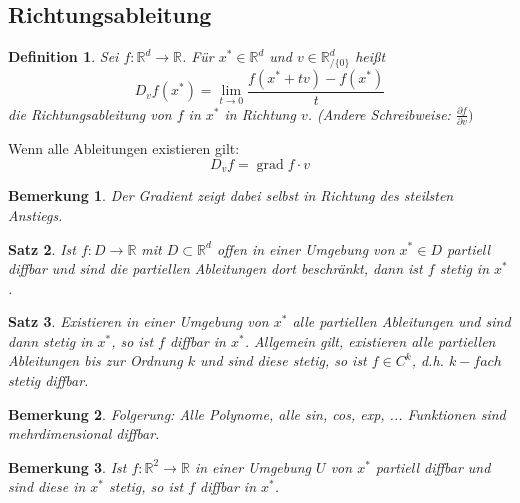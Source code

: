 \documentclass[12pt,a4paper]{report}%
\DeclareMathOperator{\grad}{grad}
\newtheorem{satz}{Satz}[section]
\newtheorem{definition}[satz]{Definition}
\newtheorem{bem}{Bemerkung}[section]
\numberwithin{equation}{section}
\newcommand{\R}{\mathbb{R}} %
\def\dfp#1#2{\frac{\partial #1}{\partial #2}}
\numberwithin{equation}{subsection}
\begin{document}
  \subsection{Richtungsableitung}
  \begin{definition}
    Sei $f: \R^d \rightarrow \R$. Für $x^* \in \R^d$ und $v \in \R^d _{/ \lbrace 0 \rbrace}$ heißt
    \begin{equation}
      D_v f(x^*) = \lim\limits_{t\rightarrow 0} \frac{f(x^* +tv)-f(x^*)}{t}
    \end{equation}
    die Richtungsableitung von $f$ in $x^*$ in Richtung $v$. (Andere Schreibweise: $\dfp{f}{v})$
  \end{definition}
  Wenn alle Ableitungen existieren gilt:
  \begin{equation}
    D_v f = \grad f \cdot v
  \end{equation}
  \begin{bem}
    Der Gradient zeigt dabei selbst in Richtung des steilsten Anstiegs.
  \end{bem}
  
  \begin{satz}
    Ist $f: D\rightarrow \R$ mit $D \subset \R^d$ offen in einer Umgebung von $x^* \in D$ partiell diffbar und sind die partiellen Ableitungen dort beschränkt, dann ist $f$ stetig in $x^*$.
  \end{satz}
  
  \begin{satz}
    Existieren in einer Umgebung von $x^*$ alle partiellen Ableitungen und sind dann stetig in $x^*$, so ist $f$ diffbar in $x^*$. Allgemein gilt, existieren alle partiellen Ableitungen bis zur Ordnung $k$ und sind diese stetig, so ist $f \in C^k$, d.h. $k-fach$ stetig diffbar.
  \end{satz}
  
  \begin{bem}
    Folgerung: Alle Polynome, alle sin, cos, exp, ... Funktionen sind mehrdimensional diffbar.
  \end{bem}
  
  \begin{bem}
    Ist $f:\R^2 \rightarrow \R$ in einer Umgebung $U$ von $x^*$ partiell diffbar und sind diese in $x^*$ stetig, so ist $f$ diffbar in $x^*$.
  \end{bem}
  
\end{document}
